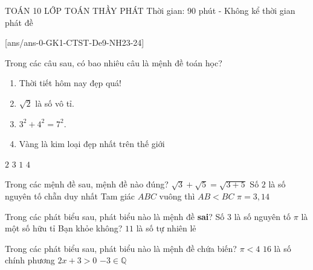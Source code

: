 \begin{name}
	{\tenchude}
	{TOÁN 10}
	{LỚP TOÁN THẦY PHÁT}
	{Thời gian: 90 phút - Không kể thời gian phát đề}
\end{name}
[ans/ans-0-GK1-CTST-De9-NH23-24]
\begin{ex}%
	Trong các câu sau, có bao nhiêu câu là mệnh đề toán học?
		\begin{enumerate}
		\item Thời tiết hôm nay đẹp quá!
		\item $\sqrt{2}$ là số vô tỉ.
		\item $3^2+4^2=7^2$.
		\item Vàng là kim loại đẹp nhất trên thế giới
	\end{enumerate}
	\choice
	{\True $2$}
	{$3$}
	{$1$}
	{$4$}
\end{ex}
\begin{ex}%
	Trong các mệnh đề sau, mệnh đề nào đúng?
	\choice
	{$\sqrt{3}+\sqrt{5}=\sqrt{3+5}$}
	{\True Số $2$ là số nguyên tố chẵn duy nhất}
	{Tam giác $ABC$ vuông thì $AB<BC$}
	{$\pi=3{,}14$}
\end{ex}
\begin{ex}%
	Trong các phát biểu sau, phát biểu nào là mệnh đề \textbf{sai}?
	\choice
	{Số $3$ là số nguyên tố}
	{\True $\pi$ là một số hữu tỉ}
	{Bạn khỏe không?}
	{$11$ là số tự nhiên lẻ}
\end{ex}
\begin{ex}%
	Trong các phát biểu sau, phát biểu nào là mệnh đề chứa biến?
	\choice
	{$\pi <4$}
	{$16$ là số chính phương}
	{\True $2x+3>0$}
	{$-3\in\mathbb{Q}$}
\end{ex}
